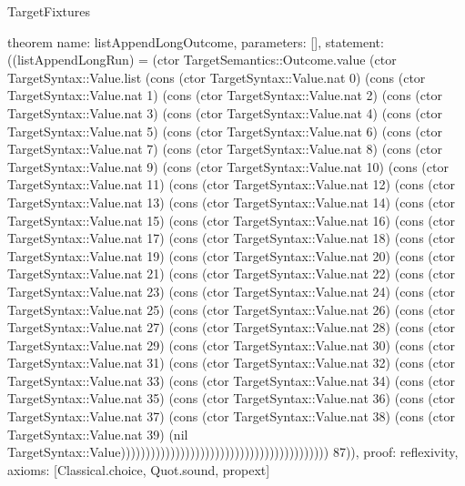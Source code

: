 \begin{lexlean}{TargetFixtures}
\begin{semanticmodule}
theorem{
  name: listAppendLongOutcome,
  parameters: [],
  statement: ((listAppendLongRun) = (ctor TargetSemantics::Outcome.value (ctor TargetSyntax::Value.list (cons (ctor TargetSyntax::Value.nat 0) (cons (ctor TargetSyntax::Value.nat 1) (cons (ctor TargetSyntax::Value.nat 2) (cons (ctor TargetSyntax::Value.nat 3) (cons (ctor TargetSyntax::Value.nat 4) (cons (ctor TargetSyntax::Value.nat 5) (cons (ctor TargetSyntax::Value.nat 6) (cons (ctor TargetSyntax::Value.nat 7) (cons (ctor TargetSyntax::Value.nat 8) (cons (ctor TargetSyntax::Value.nat 9) (cons (ctor TargetSyntax::Value.nat 10) (cons (ctor TargetSyntax::Value.nat 11) (cons (ctor TargetSyntax::Value.nat 12) (cons (ctor TargetSyntax::Value.nat 13) (cons (ctor TargetSyntax::Value.nat 14) (cons (ctor TargetSyntax::Value.nat 15) (cons (ctor TargetSyntax::Value.nat 16) (cons (ctor TargetSyntax::Value.nat 17) (cons (ctor TargetSyntax::Value.nat 18) (cons (ctor TargetSyntax::Value.nat 19) (cons (ctor TargetSyntax::Value.nat 20) (cons (ctor TargetSyntax::Value.nat 21) (cons (ctor TargetSyntax::Value.nat 22) (cons (ctor TargetSyntax::Value.nat 23) (cons (ctor TargetSyntax::Value.nat 24) (cons (ctor TargetSyntax::Value.nat 25) (cons (ctor TargetSyntax::Value.nat 26) (cons (ctor TargetSyntax::Value.nat 27) (cons (ctor TargetSyntax::Value.nat 28) (cons (ctor TargetSyntax::Value.nat 29) (cons (ctor TargetSyntax::Value.nat 30) (cons (ctor TargetSyntax::Value.nat 31) (cons (ctor TargetSyntax::Value.nat 32) (cons (ctor TargetSyntax::Value.nat 33) (cons (ctor TargetSyntax::Value.nat 34) (cons (ctor TargetSyntax::Value.nat 35) (cons (ctor TargetSyntax::Value.nat 36) (cons (ctor TargetSyntax::Value.nat 37) (cons (ctor TargetSyntax::Value.nat 38) (cons (ctor TargetSyntax::Value.nat 39) (nil TargetSyntax::Value)))))))))))))))))))))))))))))))))))))))))) 87)),
  proof: reflexivity{},
  axioms: [Classical.choice, Quot.sound, propext]
}


\end{semanticmodule}
\end{lexlean}
